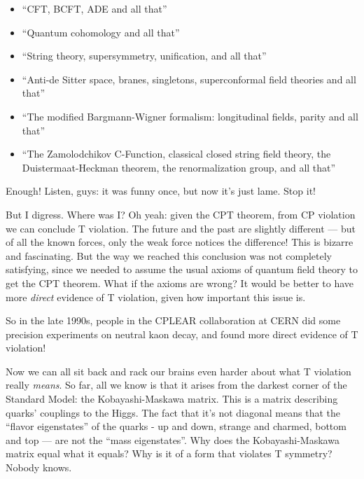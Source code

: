 \documentclass{article}
\def\tightlist{}
\renewcommand{\texttt}[1]{%
  \begingroup
  \ttfamily
  \begingroup\lccode`~=`/\lowercase{\endgroup\def~}{/\discretionary{}{}{}}%
  \begingroup\lccode`~=`[\lowercase{\endgroup\def~}{[\discretionary{}{}{}}%
  \begingroup\lccode`~=`.\lowercase{\endgroup\def~}{.\discretionary{}{}{}}%
  \catcode`/=\active\catcode`[=\active\catcode`.=\active
  \scantokens{#1\noexpand}%
  \endgroup
}
\begin{document}
\begin{itemize}
\tightlist
\item
  ``CFT, BCFT, ADE and all that''
\item
  ``Quantum cohomology and all that''
\item
  ``String theory, supersymmetry, unification, and all that''
\item
  ``Anti-de Sitter space, branes, singletons, superconformal field
  theories and all that''
\item
  ``The modified Bargmann-Wigner formalism: longitudinal fields, parity
  and all that''
\item
  ``The Zamolodchikov C-Function, classical closed string field theory,
  the Duistermaat-Heckman theorem, the renormalization group, and all
  that''
\end{itemize}

Enough! Listen, guys: it was funny once, but now it's just lame. Stop
it!

But I digress. Where was I? Oh yeah: given the CPT theorem, from CP
violation we can conclude T violation. The future and the past are
slightly different --- but of all the known forces, only the weak force
notices the difference! This is bizarre and fascinating. But the way we
reached this conclusion was not completely satisfying, since we needed
to assume the usual axioms of quantum field theory to get the CPT
theorem. What if the axioms are wrong? It would be better to have more
\emph{direct} evidence of T violation, given how important this issue
is.

So in the late 1990s, people in the CPLEAR collaboration at CERN did
some precision experiments on neutral kaon decay, and found more direct
evidence of T violation!


Now we can all sit back and rack our brains even harder about what T
violation really \emph{means}. So far, all we know is that it arises
from the darkest corner of the Standard Model: the Kobayashi-Maskawa
matrix. This is a matrix describing quarks' couplings to the Higgs. The
fact that it's not diagonal means that the ``flavor eigenstates'' of the
quarks - up and down, strange and charmed, bottom and top --- are not
the ``mass eigenstates''. Why does the Kobayashi-Maskawa matrix equal
what it equals? Why is it of a form that violates T symmetry? Nobody
knows.
\end{document}

